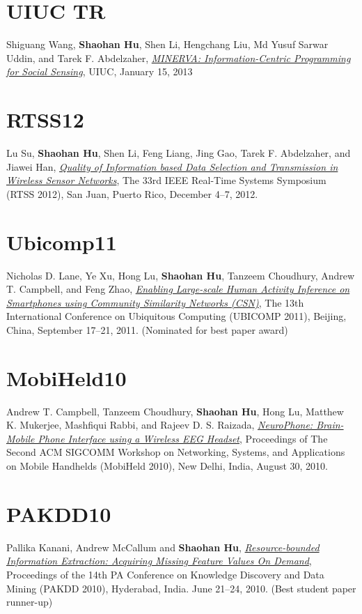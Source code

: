 \section{\sc UIUC TR}\hypertarget{wang2013uiuc}{}
Shiguang Wang, \textbf{Shaohan Hu}, Shen Li, Hengchang Liu, Md Yusuf
Sarwar Uddin, and Tarek F. Abdelzaher, \href{https://www.ideals.illinois.edu/handle/2142/42511}{\emph{MINERVA: Information-Centric
  Programming for Social Sensing}}, \textsf{UIUC}, January 15, 2013

\section{\sc RTSS12}\hypertarget{su2012rtss}{}
Lu Su, \textbf{Shaohan Hu}, Shen Li, Feng Liang, Jing Gao, Tarek
F. Abdelzaher, and Jiawei Han, \href{http://ieeexplore.ieee.org/xpl/articleDetails.jsp?arnumber=6424815}{\emph{Quality of Information based Data
  Selection and Transmission in Wireless Sensor Networks}}, \textsf{The
  33rd IEEE Real-Time Systems Symposium (RTSS 2012)}, San Juan, Puerto
Rico, December 4--7, 2012.

\section{\sc Ubicomp11}\hypertarget{lane2011ubicomp}{}
Nicholas D. Lane, Ye Xu, Hong Lu, \textbf{Shaohan Hu}, Tanzeem
Choudhury, Andrew T. Campbell, and Feng Zhao, \href{http://portal.acm.org/citation.cfm?id=2030160}{\emph{Enabling
  Large-scale Human Activity Inference on Smartphones using Community
  Similarity Networks (CSN)}}, \textsf{The 13th International
  Conference on Ubiquitous Computing (UBICOMP 2011)}, Beijing, China,
September 17--21, 2011. (Nominated for best paper award)

\section{\sc MobiHeld10}\hypertarget{campbell2010mobiheld}{}
Andrew T. Campbell, Tanzeem Choudhury, \textbf{Shaohan Hu}, Hong Lu,
Matthew K. Mukerjee, Mashfiqui Rabbi, and Rajeev D. S. Raizada,
\href{http://portal.acm.org/citation.cfm?id=1851326}{\emph{NeuroPhone: Brain-Mobile Phone Interface using a Wireless EEG
  Headset}}, \textsf{Proceedings of The Second ACM SIGCOMM Workshop on
  Networking, Systems, and Applications on Mobile Handhelds (MobiHeld
  2010)}, New Delhi, India, August 30, 2010.

\section{\sc PAKDD10}\hypertarget{kanani2010pakdd}{}
Pallika Kanani, Andrew McCallum and \textbf{Shaohan Hu},
\href{http://www.springerlink.com/content/j41w758434321108}{\emph{Resource-bounded Information Extraction: Acquiring Missing
  Feature Values On Demand}}, \textsf{Proceedings of the 14th PA
  Conference on Knowledge Discovery and Data Mining (PAKDD 2010)},
Hyderabad, India. June 21--24, 2010. (Best student paper runner-up)

